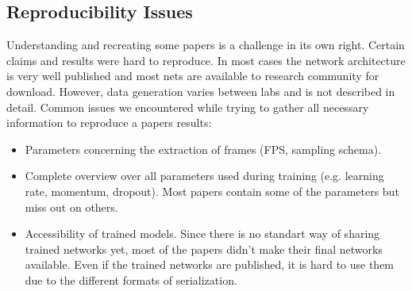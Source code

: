 \subsection*{Reproducibility Issues}
Understanding and recreating some papers is a challenge in its own right. Certain claims and results were hard to reproduce. In most cases the network architecture is very well published and most nets are available to research community for download. However, data generation varies between labs and is not described in detail.
Common issues we encountered while trying to gather all necessary information to reproduce a papers results:
\begin{itemize}
	\item Parameters concerning the extraction of frames (FPS, sampling schema).
	\item Complete overview over all parameters used during training (e.g. learning rate, momentum, dropout). Most papers contain some of the parameters but miss out on others.
	\item Accessibility of trained models. Since there is no standart way of sharing trained networks yet, most of the papers didn't make their final networks available. Even if the trained networks are published, it is hard to use them due to the different formats of serialization.
\end{itemize}